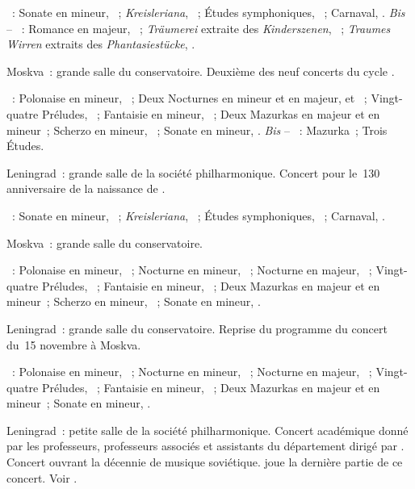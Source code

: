 \begin{description}
 \textsc{\Schumann{}}~: Sonate en \kF mineur, ~;
 \emph{Kreisleriana}, ~; Études symphoniques, ~; Carnaval,
 .
 \emph{Bis} -- \textsc{\Schumann{}}~: Romance en \kF \Sharp majeur,
  ~; \emph{Träumerei} extraite des \emph{Kinderszenen},
 ~; \emph{Traumes Wirren} extraits des \emph{Phantasiestücke},
  .
 \item[\DateWithWeekDay{1939-10-15}]
 Moskva~: grande salle du conservatoire.
 Deuxième des neuf concerts du cycle \Chopin{}.

 \textsc{\Chopin{}}~: Polonaise en \kC mineur,  ~; Deux
 Nocturnes en \kC mineur et en \kF majeur,   et 
 ~; Vingt-quatre Préludes, ~; Fantaisie en \kF mineur,
 ~; Deux Mazurkas en \kC majeur et en \kF mineur~; Scherzo en \kB
 mineur, ~; Sonate en \kB \Flat mineur, .
 \emph{Bis} -- \textsc{\Chopin{}}~: Mazurka~; Trois Études.
 \item[\DateWithWeekDay{1939-10-31}]
 Leningrad~: grande salle de la société philharmonique.
 Concert pour le~130\ieme{} anniversaire de la naissance de \Schumann{}.

 \textsc{\Schumann{}}~: Sonate en \kF mineur, ~;
 \emph{Kreisleriana}, ~; Études symphoniques, ~; Carnaval,
 .
 \item[\DateWithWeekDay{1939-11-15}]
 Moskva~: grande salle du conservatoire.

 \textsc{\Chopin{}}~: Polonaise en \kC mineur,  ~;
 Nocturne en \kC mineur,  ~; Nocturne en \kF majeur,
  ~; Vingt-quatre Préludes, ~; Fantaisie en \kF
 mineur, ~; Deux Mazurkas en \kC majeur et en \kF mineur~; Scherzo
 en \kB \Flat mineur, ~; Sonate en \kB \Flat mineur, .
 \item[\DateWithWeekDay{1939-12-02}]
 Leningrad~: grande salle du conservatoire.
 Reprise du programme du concert du~15 novembre à Moskva.

 \textsc{\Chopin{}}~: Polonaise en \kC mineur,  ~;
 Nocturne en \kC mineur,  ~; Nocturne en \kF majeur,
  ~; Vingt-quatre Préludes, ~; Fantaisie en \kF
 mineur, ~; Deux Mazurkas en \kC majeur et en \kF mineur~; Sonate
 en \kB \Flat mineur, .
 \item[\DateWithWeekDay{1939-12-07}]
 Leningrad~: petite salle de la société philharmonique.
 Concert académique donné par les professeurs, professeurs associés et
 assistants du département dirigé par \LNikolaiev{}.
 Concert ouvrant la décennie de musique soviétique.
 \VSofronitsky{} joue la dernière partie de ce concert.
 Voir \citet[p.~161]{Nekrasova08}.


\end{description}

